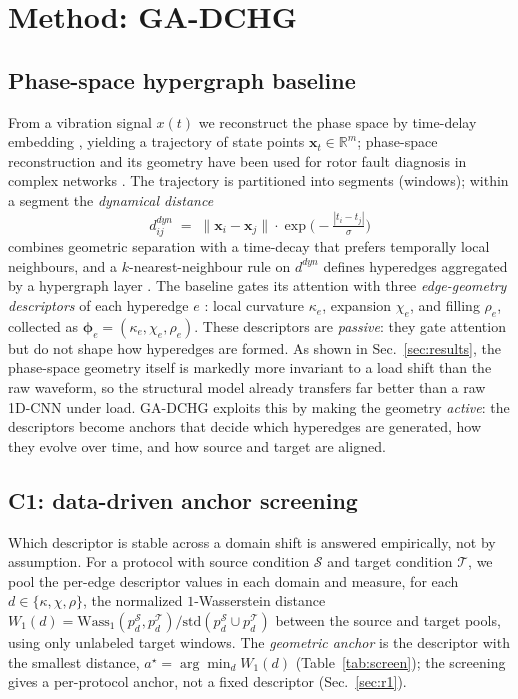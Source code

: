 \section{Method: GA-DCHG}
\label{sec:method}

\subsection{Phase-space hypergraph baseline}
\label{sec:baseline}

From a vibration signal $x(t)$ we reconstruct the phase space by time-delay
embedding \cite{takens1981,fraser1986,kennel1992}, yielding a trajectory of
state points $\bm{x}_t\in\mathbb{R}^m$; phase-space reconstruction and its
geometry have been used for rotor fault diagnosis in complex networks
\cite{zhao2025icmds}. The trajectory is partitioned into
segments (windows); within a segment the \emph{dynamical distance}
\begin{equation}
  d^{dyn}_{ij} \;=\; \lVert \bm{x}_i - \bm{x}_j \rVert \cdot \exp\!\bigl(
  -\tfrac{|t_i - t_j|}{\sigma}\bigr)
\label{eq:dyn}
\end{equation}
combines geometric separation with a time-decay that prefers temporally local
neighbours, and a $k$-nearest-neighbour rule on $d^{dyn}$ defines hyperedges
aggregated by a hypergraph layer \cite{feng2019}. The baseline gates its
attention with three \emph{edge-geometry descriptors} of each hyperedge $e$
\cite{grassberger1983}: local curvature $\kappa_e$, expansion $\chi_e$, and
filling $\rho_e$, collected as $\bm{\phi}_e=(\kappa_e,\chi_e,\rho_e)$. These
descriptors are \emph{passive}: they gate attention but do not shape how
hyperedges are formed.
As shown in Sec.~\ref{sec:results}, the phase-space geometry itself is markedly
more invariant to a load shift than the raw waveform, so the structural model
already transfers far better than a raw 1D-CNN under load. GA-DCHG exploits this
by making the geometry \emph{active}: the descriptors become anchors that decide
which hyperedges are generated, how they evolve over time, and how source and
target are aligned.

\subsection{C1: data-driven anchor screening}
\label{sec:c1}

Which descriptor is stable across a domain shift is answered empirically, not by
assumption. For a protocol with source condition $\mathcal{S}$ and target
condition $\mathcal{T}$, we pool the per-edge descriptor values in each domain
and measure, for each $d\in\{\kappa,\chi,\rho\}$, the normalized
$1$-Wasserstein distance $W_1(d)=\mathrm{Wass}_1(p_d^{\mathcal{S}},
p_d^{\mathcal{T}})/\mathrm{std}(p_d^{\mathcal{S}}\cup p_d^{\mathcal{T}})$
between the source and target pools, using only unlabeled target windows. The
\emph{geometric anchor} is the descriptor with the smallest distance,
$a^\star=\arg\min_d W_1(d)$ (Table~\ref{tab:screen}); the screening gives a
per-protocol anchor, not a fixed descriptor (Sec.~\ref{sec:r1}).

